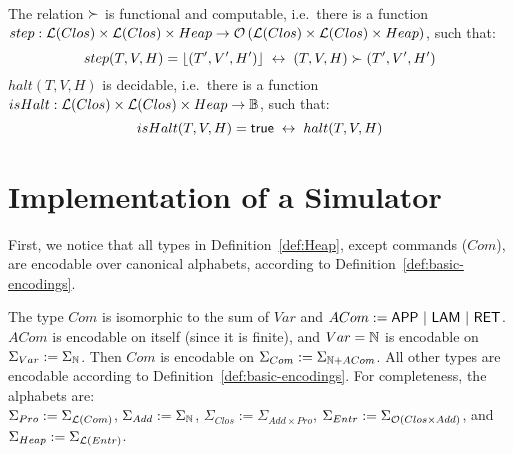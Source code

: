 \begin{lemma}
  \label{lem:heap-red}
  ~
  \begin{enumerate}
     \label{lem:step-iff}%
    The relation $\succ$ is functional and computable, i.e.\ there is a function
    $step : \mathcal{L}(Clos) \times \mathcal{L}(Clos) \times Heap \rightarrow \mathcal{O}\left(\mathcal{L}(Clos) \times \mathcal{L}(Clos) \times Heap\right)$, such that:
    \[
      step(T,V,H)=\left\lfloor {(T',V',H')} \right\rfloor ~\mathbin{\leftrightarrow}~ (T,V,H) \succ (T',V',H')
    \]
     \label{lem:halt_state_dec}%
    $halt(T,V,H)$ is decidable, i.e.\ there is a function $isHalt : \mathcal{L}(Clos) \times \mathcal{L}(Clos) \times Heap \rightarrow \mathbb{B}$, such that:
    \[
      isHalt(T,V,H) = \mathsf{true} ~\mathbin{\leftrightarrow}~ halt(T,V,H)
    \]
  \end{enumerate}
\end{lemma}


\section{Implementation of a Simulator}
\label{sec:heap-implementation}

First, we notice that all types in Definition~\ref{def:Heap}, except commands ($Com$), are encodable over canonical alphabets, according to
Definition~\ref{def:basic-encodings}.  %
\begin{definition}
  \label{def:Heap-encode}
  The type $Com$ is isomorphic to the sum of $Var$ and $ACom := \mathsf{APP} ~|~ \mathsf{LAM} ~|~ \mathsf{RET}$.  $ACom$ is encodable on itself (since it is
  finite), and $Var = \mathbb{N}$ is encodable on $\Sigma_{Var} := \Sigma_{\mathbb{N}}$.  Then $Com$ is encodable on $\Sigma_{Com} := \Sigma_{\mathbb{N}+ACom}$.  All
  other types are encodable according to Definition~\ref{def:basic-encodings}.
  For completeness, the alphabets are:\\
  $\Sigma_{Pro} := \Sigma_{\mathcal{L}(Com)}$, $\Sigma_{Add} := \Sigma_{\mathbb{N}}$, $\Sigma_{Clos}:=\Sigma_{Add \times Pro}$,
  $\Sigma_{Entr} := \Sigma_{\mathcal{O}(Clos \times Add)}$, and $\Sigma_{Heap} := \Sigma_{\mathcal{L}(Entr)}$.
\end{definition}

